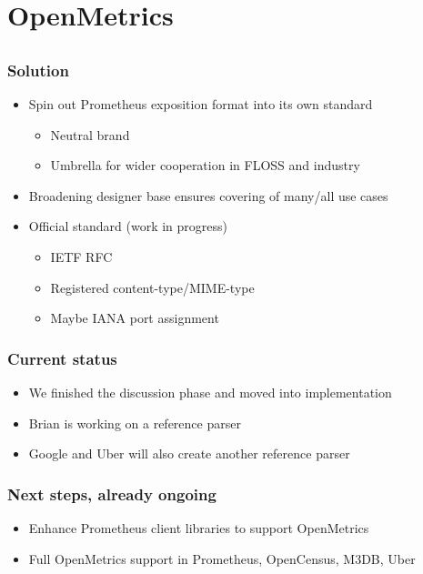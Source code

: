 \documentclass[t]{beamer}
\begin{document}
\section{OpenMetrics}

\subsection{}

\begin{frame}
	\frametitle{Solution}
	\vfill
	\begin{itemize}
		\item Spin out Prometheus exposition format into its own standard
		\begin{itemize}
			\item Neutral brand
			\item Umbrella for wider cooperation in FLOSS and industry
		\end{itemize}
		\item Broadening designer base ensures covering of many/all use cases
		\item Official standard (work in progress)
		\begin{itemize}
			\item IETF RFC
			\item Registered content-type/MIME-type
			\item Maybe IANA port assignment
		\end{itemize}
	\end{itemize}
	\vfill
\end{frame}

\begin{frame}
	\frametitle{Current status}
	\vfill
	\begin{itemize}
		\item We finished the discussion phase and moved into implementation
		\item Brian is working on a reference parser
		\item Google and Uber will also create another reference parser
	\end{itemize}
	\vfill
\end{frame}

\begin{frame}
	\frametitle{Next steps, already ongoing}
	\vfill
	\begin{itemize}
		\item Enhance Prometheus client libraries to support OpenMetrics
		\item Full OpenMetrics support in Prometheus, OpenCensus, M3DB, Uber
	\end{itemize}
	\vfill
\end{frame}
\end{document}
